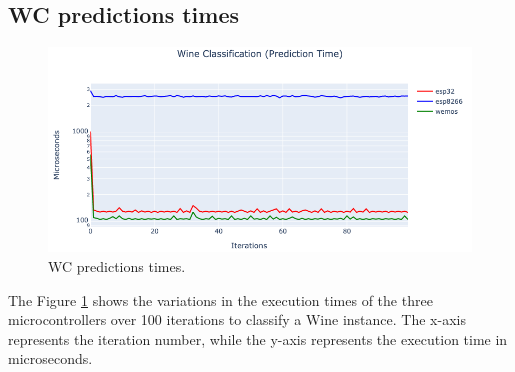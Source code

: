 \documentclass{article}
\begin{document}
\subsection{WC predictions times}

\begin{minipage}{0.7\textwidth}
    \begin{figure}[H]
        \centering
        \includegraphics[scale=0.45]{WC-PredictionsTimes.png}
        \caption{WC predictions times.}
        \label{fig:6}
    \end{figure}
\end{minipage}
\hfill
\begin{minipage}{0.3\textwidth}
    \begin{table}[H]
        \caption{WC descriptive statistics.}    
        \centering
        \label{tab:2}
    \end{table}
\end{minipage}
\break

The Figure \ref{fig:6} shows the variations in the execution times of the three microcontrollers over 100 iterations to classify a Wine instance. The x-axis represents the iteration number, while the y-axis represents the execution time in microseconds. 
\end{document}

